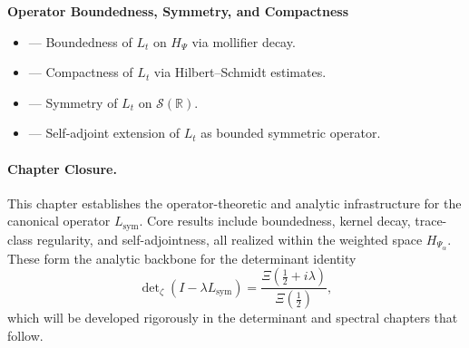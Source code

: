 \textbf{Operator Boundedness, Symmetry, and Compactness}
\begin{itemize}
  \item {} — Boundedness of \( L_t \) on \( H_\Psi \) via mollifier decay.
  \item {} — Compactness of \( L_t \) via Hilbert–Schmidt estimates.
  \item {} — Symmetry of \( L_t \) on \( \mathcal{S}(\mathbb{R}) \).
  \item {} — Self-adjoint extension of \( L_t \) as bounded symmetric operator.
\end{itemize}

\paragraph{Chapter Closure.}
This chapter establishes the operator-theoretic and analytic infrastructure for the canonical operator \( L_{\mathrm{sym}} \). Core results include boundedness, kernel decay, trace-class regularity, and self-adjointness, all realized within the weighted space \( H_{\Psi_\alpha} \). These form the analytic backbone for the determinant identity
\[
\det\nolimits_{\zeta}(I - \lambda L_{\mathrm{sym}})
= \frac{\Xi\left(\tfrac{1}{2} + i\lambda \right)}{\Xi\left(\tfrac{1}{2} \right)},
\]
which will be developed rigorously in the determinant and spectral chapters that follow.
